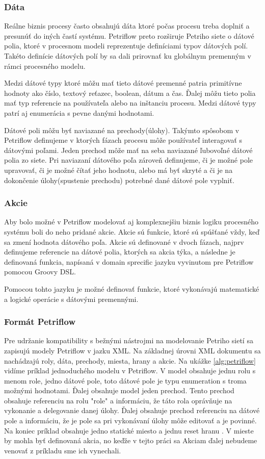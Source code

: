 \subsubsection{Dáta}
Reálne biznis procesy často obsahujú dáta ktoré  počas procesu treba doplniť a presunúť do iných častí systému. Petriflow preto rozširuje Petriho siete o dátové polia, ktoré v procesnom modeli reprezentuje definíciami typov dátových polí. Takéto definície dátových polí by sa dali prirovnať ku globálnym premenným v rámci procesného modelu.  

Medzi dátové typy ktoré môžu  mať tieto dátové premenné patria primitívne hodnoty ako číslo, textový reťazec, boolean, dátum a čas. Ďalej môžu tieto polia mať typ referencie na používateľa alebo na inštanciu procesu. Medzi dátové typy patrí aj enumerácia s pevne danými hodnotami.

Dátové poli môžu byť naviazané na prechody(úlohy). Takýmto spôsobom v Petriflow definujeme v ktorých fázach procesu môže používateľ interagovať s dátovými poľami. Jeden prechod môže mať na seba naviazané ľubovoľné dátové polia zo siete. Pri naviazaní dátového poľa zároveň definujeme, či je možné pole upravovať, či je možné čítať jeho hodnotu, alebo má byť skryté a či je na dokončenie úlohy(spustenie prechodu) potrebné dané dátové pole vyplniť.  

\subsubsection{Akcie}
Aby bolo možné v Petriflow modelovať aj komplexnejšiu biznis logiku procesného systému boli do neho pridané akcie. Akcie sú funkcie, ktoré sú spúšťané vždy, keď sa zmení hodnota dátového poľa. Akcie sú definované v dvoch fázach, najprv definujeme referencie na dátové polia, ktorých sa akcia týka, a následne je definovaná funkcia, napísaná v domain sprecific jazyku vyvinutom pre Petriflow pomocou Groovy DSL. 

Pomocou tohto jazyku je možné definovať funkcie, ktoré vykonávajú matematické a logické operácie s dátovými premennými. 

\subsubsection{Formát Petriflow}
Pre udržanie kompatibility s bežnými nástrojmi na modelovanie Petriho sietí sa zapisujú modely Petriflow v jazku XML. Na základnej úrovni XML dokumentu sa nachádzajú roly, dáta, prechody, miesta, hrany a akcie. Na ukážke \ref{alg:petriflow} vidíme príklad jednoduchého modelu v Petriflow. 
V model obsahuje jednu rolu s menom role, 
jedno dátové pole, toto dátové pole je typu enumeration s troma možnými hodnotami. 
Ďalej obsahuje model jeden prechod. Tento prechod obsahuje referenciu na rolu "role" a informáciu, že táto rola oprávňuje na vykonanie a delegovanie danej úlohy. Ďalej obsahuje prechod referenciu na dátové pole a informáciu, že je pole sa pri vykonávaní úlohy môže editovať a je povinné.
Na koniec príklad obsahuje jedno statické miesto a jednu reset hranu . V mieste by mohla byť definovaná akcia, no keďže v tejto práci sa Akciam ďalej nebudeme venovať z príkladu sme ich vynechali.

